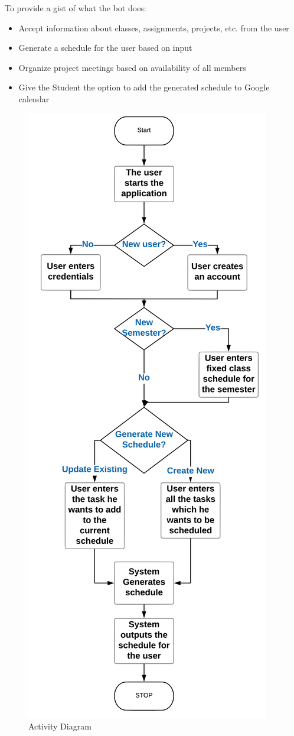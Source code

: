 \documentclass{sig-alternate-05-2015}
\begin{document}
\par
To provide a gist of what the bot does:
\begin{itemize}
\par
  \item Accept information about classes, assignments, projects, etc. from the user
  \item Generate a schedule for the user based on input
  \item Organize project meetings based on availability of all members
  \item Give the Student the option to add the generated schedule to Google calendar
\end{itemize}
\begin{figure}
\includegraphics[scale = 0.36]{ActivityDiagram}
\centering
\caption{Activity Diagram}
\end{figure}
\end{document}
